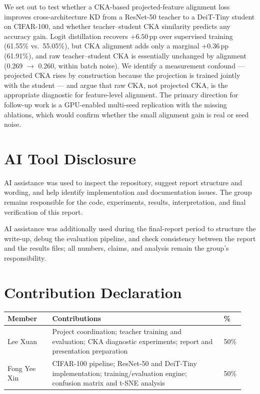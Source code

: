 \documentclass[11pt, letterpaper]{article}
\begin{document}
We set out to test whether a CKA-based projected-feature alignment loss
improves cross-architecture KD from a ResNet-50 teacher to a DeiT-Tiny
student on CIFAR-100, and whether teacher--student CKA similarity predicts
any accuracy gain. Logit distillation recovers $+6.50$\,pp over supervised
training (61.55\% vs.\ 55.05\%), but CKA alignment adds only a marginal
$+0.36$\,pp (61.91\%), and raw teacher--student CKA is essentially unchanged
by alignment (0.269 $\to$ 0.260, within batch noise). We identify a
measurement confound --- projected CKA rises by construction because the
projection is trained jointly with the student --- and argue that raw CKA,
not projected CKA, is the appropriate diagnostic for feature-level
alignment. The primary direction for follow-up work is a GPU-enabled
multi-seed replication with the missing ablations, which would confirm
whether the small alignment gain is real or seed noise.

\section{AI Tool Disclosure}

AI assistance was used to inspect the repository, suggest report structure and
wording, and help identify implementation and documentation issues. The group
remains responsible for the code, experiments, results, interpretation, and
final verification of this report.

AI assistance was additionally used during the final-report
period to structure the write-up, debug the evaluation pipeline, and check
consistency between the report and the results files; all numbers, claims,
and analysis remain the group's responsibility.

\section{Contribution Declaration}

\begin{tabular}{@{}p{0.18\linewidth}p{0.69\linewidth}p{0.07\linewidth}@{}}
\toprule
\textbf{Member} & \textbf{Contributions} & \textbf{\%} \\
\midrule
Lee Xuan & Project coordination; teacher training and evaluation; CKA diagnostic experiments; report and presentation preparation & 50\% \\
Fong Yee Xin & CIFAR-100 pipeline; ResNet-50 and DeiT-Tiny implementation; training/evaluation engine; confusion matrix and t-SNE analysis & 50\% \\
\bottomrule
\end{tabular}
\end{document}
